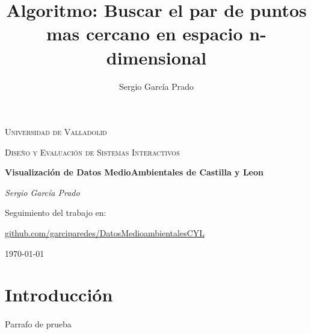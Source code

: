 \documentclass{article}
\title{Algoritmo: Buscar el par de puntos mas cercano en espacio n-dimensional}
\author{Sergio García Prado}
\begin{document}
\begin{titlepage}
	\centering
	{\scshape\LARGE Universidad de Valladolid \par}
	\vspace{1cm}
	{\scshape\Large Diseño y Evaluación de Sistemas Interactivos\par}
	\vspace{1.5cm}
	{\huge\bfseries Visualización de Datos MedioAmbientales de Castilla y Leon\par}
	\vspace{2cm}
	{\Large\itshape Sergio García Prado\par}
	
	\vfill
	Seguimiento del trabajo en: \par
	\href{https://github.com/garciparedes/DatosMedioambientalesCYL}{github.com/garciparedes/DatosMedioambientalesCYL}

	\vfill


	{\large \today\par}
\end{titlepage}

\tableofcontents

\section{Introducción}

	\paragraph{}
	Parrafo de prueba
\end{document}
